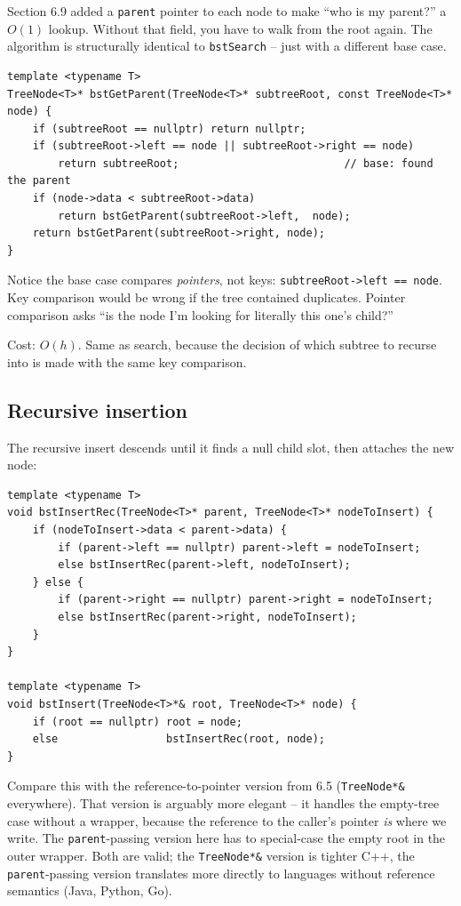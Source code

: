 \documentclass[11pt]{article}
\begin{document}
Section 6.9 added a \texttt{parent} pointer to each node to make ``who is my parent?'' a $O(1)$ lookup. Without that field, you have to walk from the root again. The algorithm is structurally identical to \texttt{bstSearch} -- just with a different base case.

\begin{lstlisting}
template <typename T>
TreeNode<T>* bstGetParent(TreeNode<T>* subtreeRoot, const TreeNode<T>* node) {
    if (subtreeRoot == nullptr) return nullptr;
    if (subtreeRoot->left == node || subtreeRoot->right == node)
        return subtreeRoot;                          // base: found the parent
    if (node->data < subtreeRoot->data)
        return bstGetParent(subtreeRoot->left,  node);
    return bstGetParent(subtreeRoot->right, node);
}
\end{lstlisting}

Notice the base case compares \emph{pointers}, not keys: \texttt{subtreeRoot->left == node}. Key comparison would be wrong if the tree contained duplicates. Pointer comparison asks ``is the node I'm looking for literally this one's child?''

Cost: $O(h)$. Same as search, because the decision of which subtree to recurse into is made with the same key comparison.

\subsection*{Recursive insertion}

The recursive insert descends until it finds a null child slot, then attaches the new node:

\begin{lstlisting}
template <typename T>
void bstInsertRec(TreeNode<T>* parent, TreeNode<T>* nodeToInsert) {
    if (nodeToInsert->data < parent->data) {
        if (parent->left == nullptr) parent->left = nodeToInsert;
        else bstInsertRec(parent->left, nodeToInsert);
    } else {
        if (parent->right == nullptr) parent->right = nodeToInsert;
        else bstInsertRec(parent->right, nodeToInsert);
    }
}

template <typename T>
void bstInsert(TreeNode<T>*& root, TreeNode<T>* node) {
    if (root == nullptr) root = node;
    else                 bstInsertRec(root, node);
}
\end{lstlisting}

Compare this with the reference-to-pointer version from 6.5 (\texttt{TreeNode*\&} everywhere). That version is arguably more elegant -- it handles the empty-tree case without a wrapper, because the reference to the caller's pointer \emph{is} where we write. The \texttt{parent}-passing version here has to special-case the empty root in the outer wrapper. Both are valid; the \texttt{TreeNode*\&} version is tighter C++, the \texttt{parent}-passing version translates more directly to languages without reference semantics (Java, Python, Go).
\end{document}
